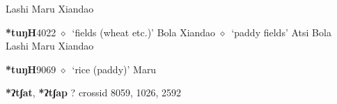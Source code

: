 \begin{list}{}{\leftmargin=1.5em \itemindent=-1.5em}
\hspace{1ex}
         Lashi 
\hspace{1ex}
         Maru 
\hspace{1ex}
         Xiandao 
  \item {\footnotesize \textbf{*tuŋH}}{\tiny 4022}
\hspace{1ex}
         $\diamond$~`fields (wheat etc.)'
         Bola 
\hspace{1ex}
         Xiandao 
\hspace{1ex}
         $\diamond$~`paddy fields'
         Atsi 
\hspace{1ex}
         Bola 
\hspace{1ex}
         Lashi 
\hspace{1ex}
         Maru 
\hspace{1ex}
         Xiandao 
  \item {\footnotesize \textbf{*tuŋH}}{\tiny 9069}
\hspace{1ex}
         $\diamond$~`rice (paddy)'
         Maru 
  \end{list}
\item
\textbf{*ʔtʃat}, \textbf{*ʔtʃap}
?
  {\tiny crossid 8059, 1026, 2592}
